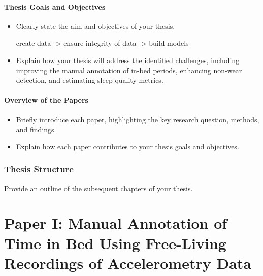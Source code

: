 \documentclass[
  9pt,
]{scrbook}
\begin{document}
\hypertarget{thesis-goals-and-objectives}{%
\subsubsection{Thesis Goals and
Objectives}\label{thesis-goals-and-objectives}}

\begin{itemize}
\item
  Clearly state the aim and objectives of your thesis.

  create data -\textgreater{} ensure integrity of data -\textgreater{}
  build models
\item
  Explain how your thesis will address the identified challenges,
  including improving the manual annotation of in-bed periods, enhancing
  non-wear detection, and estimating sleep quality metrics.
\end{itemize}

\hypertarget{overview-of-the-papers}{%
\subsubsection{Overview of the Papers}\label{overview-of-the-papers}}

\begin{itemize}
\item
  Briefly introduce each paper, highlighting the key research question,
  methods, and findings.
\item
  Explain how each paper contributes to your thesis goals and
  objectives.
\end{itemize}

\hypertarget{thesis-structure}{%
\subsection{Thesis Structure}\label{thesis-structure}}

Provide an outline of the subsequent chapters of your thesis.

\newpage

\hypertarget{paper-i-manual-annotation-of-time-in-bed-using-free-living-recordings-of-accelerometry-data}{%
\chapter{Paper I: Manual Annotation of Time in Bed Using Free-Living
Recordings of Accelerometry
Data}\label{paper-i-manual-annotation-of-time-in-bed-using-free-living-recordings-of-accelerometry-data}}
\end{document}
